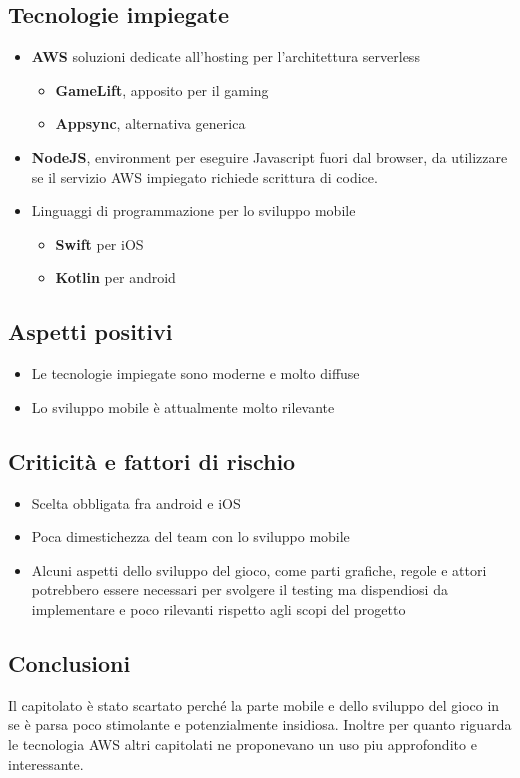 \subsection{Tecnologie impiegate}
\begin{itemize}
    \item \textbf{AWS} soluzioni dedicate all'hosting per l'architettura serverless\begin{itemize}
        \item \textbf{GameLift}, apposito per il gaming
        \item \textbf{Appsync}, alternativa generica
    \end{itemize}
    \item \textbf{NodeJS}, environment per eseguire Javascript fuori dal browser, da utilizzare se il servizio AWS impiegato richiede scrittura di codice.
    \item Linguaggi di programmazione per lo sviluppo mobile \begin{itemize}
        \item \textbf{Swift} per iOS
        \item \textbf{Kotlin} per android
    \end{itemize}
\end{itemize}
\subsection{Aspetti positivi}
\begin{itemize}
    \item Le tecnologie impiegate sono moderne e molto diffuse
    \item Lo sviluppo mobile \`e attualmente molto rilevante
\end{itemize}
\subsection{Criticit\`a e fattori di rischio}
\begin{itemize}
    \item Scelta obbligata fra android e iOS
    \item Poca dimestichezza del team con lo sviluppo mobile
    \item Alcuni aspetti dello sviluppo del gioco, come parti grafiche, regole e attori potrebbero essere necessari per svolgere il testing ma dispendiosi da implementare e poco rilevanti rispetto agli scopi del progetto
\end{itemize}
\subsection{Conclusioni}
Il capitolato \`e stato scartato perch\'e la parte mobile e dello sviluppo del gioco in se \`e parsa poco stimolante e potenzialmente insidiosa. Inoltre per quanto riguarda le tecnologia AWS altri capitolati ne proponevano un uso piu approfondito e interessante.